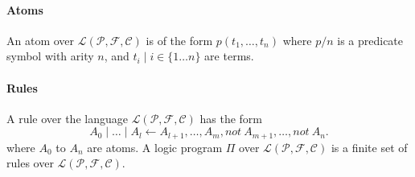 \documentclass[a4paper,10pt]{article}
\begin{document}
\paragraph{Atoms}
An atom over $\mathcal{L(P, F, C)}$ is of the form $p(t_1, \dots, t_n)$ where $p/n$ is a predicate
symbol with arity $n$, and $t_i \mid i \in \{1 \dots n\}$ are terms.
\paragraph{Rules}
A rule over the language $\mathcal{L(P,F,C)}$ has the form
$$
A_0 \mid \dots \mid A_l \leftarrow A_{l+1}, \dots, A_m, not\ A_{m+1}, \dots, not\ A_n.
$$
where $A_0$ to $A_n$ are atoms. \newline
A logic program $\Pi$ over $\mathcal{L(P,F,C)}$ is a finite set of rules over $\mathcal{L(P,F,C)}$.
\end{document}
